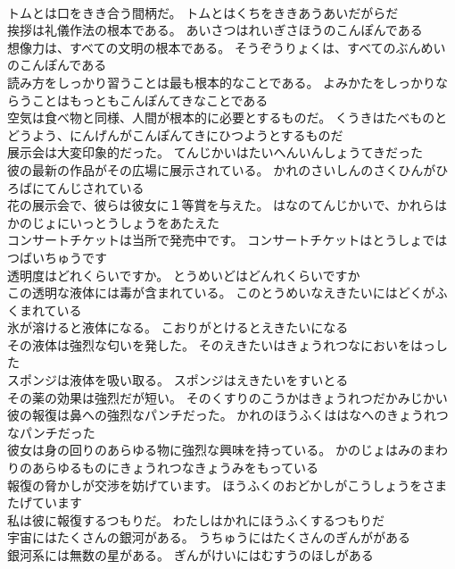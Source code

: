 \documentclass[8pt]{extreport}
\begin{document}
\begin{CJK}{UTF8}{min}
\\	トムとは口をきき合う間柄だ。	トムとはくちをききあうあいだがらだ 
\\	挨拶は礼儀作法の根本である。	あいさつはれいぎさほうのこんぽんである 
\\	想像力は、すべての文明の根本である。	そうぞうりょくは、すべてのぶんめいのこんぽんである 
\\	読み方をしっかり習うことは最も根本的なことである。	よみかたをしっかりならうことはもっともこんぽんてきなことである 
\\	空気は食べ物と同様、人間が根本的に必要とするものだ。	くうきはたべものとどうよう、にんげんがこんぽんてきにひつようとするものだ 
\\	展示会は大変印象的だった。	てんじかいはたいへんいんしょうてきだった 
\\	彼の最新の作品がその広場に展示されている。	かれのさいしんのさくひんがひろばにてんじされている 
\\	花の展示会で、彼らは彼女に１等賞を与えた。	はなのてんじかいで、かれらはかのじょにいっとうしょうをあたえた 
\\	コンサートチケットは当所で発売中です。	コンサートチケットはとうしょではつばいちゅうです 
\\	透明度はどれくらいですか。	とうめいどはどんれくらいですか 
\\	この透明な液体には毒が含まれている。	このとうめいなえきたいにはどくがふくまれている 
\\	氷が溶けると液体になる。	こおりがとけるとえきたいになる 
\\	その液体は強烈な匂いを発した。	そのえきたいはきょうれつなにおいをはっした 
\\	スポンジは液体を吸い取る。	スポンジはえきたいをすいとる 
\\	その薬の効果は強烈だが短い。	そのくすりのこうかはきょうれつだかみじかい 
\\	彼の報復は鼻への強烈なパンチだった。	かれのほうふくははなへのきょうれつなパンチだった 
\\	彼女は身の回りのあらゆる物に強烈な興味を持っている。	かのじょはみのまわりのあらゆるものにきょうれつなきょうみをもっている 
\\	報復の脅かしが交渉を妨げています。	ほうふくのおどかしがこうしょうをさまたげています 
\\	私は彼に報復するつもりだ。	わたしはかれにほうふくするつもりだ 
\\	宇宙にはたくさんの銀河がある。	うちゅうにはたくさんのぎんががある 
\\	銀河系には無数の星がある。	ぎんがけいにはむすうのほしがある 

\end{CJK}
\end{document}
